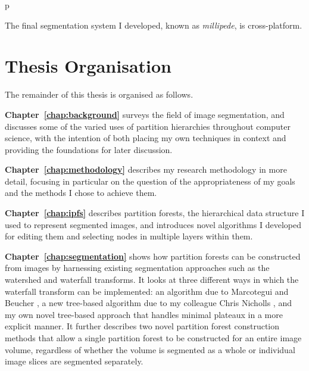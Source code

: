 \begin{stusubfig}{p}
\caption{The final segmentation system I developed, known as \emph{millipede}, is cross-platform.}
\label{fig:introduction-millipede-seg}
\end{stusubfig}


\section*{Thesis Organisation}

The remainder of this thesis is organised as follows.

\textbf{Chapter~\ref{chap:background}} surveys the field of image segmentation, and discusses some of the varied uses of partition hierarchies throughout computer science, with the intention of both placing my own techniques in context and providing the foundations for later discussion.

\textbf{Chapter~\ref{chap:methodology}} describes my research methodology in more detail, focusing in particular on the question of the appropriateness of my goals and the methods I chose to achieve them.

\textbf{Chapter~\ref{chap:ipfs}} describes partition forests, the hierarchical data structure I used to represent segmented images, and introduces novel algorithms I developed for editing them and selecting nodes in multiple layers within them.

\textbf{Chapter~\ref{chap:segmentation}} shows how partition forests can be constructed from images by harnessing existing segmentation approaches such as the watershed and waterfall transforms. It looks at three different ways in which the waterfall transform can be implemented: an algorithm due to Marcotegui and Beucher \cite{marcotegui05}, a new tree-based algorithm due to my colleague Chris Nicholls \cite{nicholls09}, and my own novel tree-based approach that handles minimal plateaux in a more explicit manner. It further describes two novel partition forest construction methods that allow a single partition forest to be constructed for an entire image volume, regardless of whether the volume is segmented as a whole or individual image slices are segmented separately.

